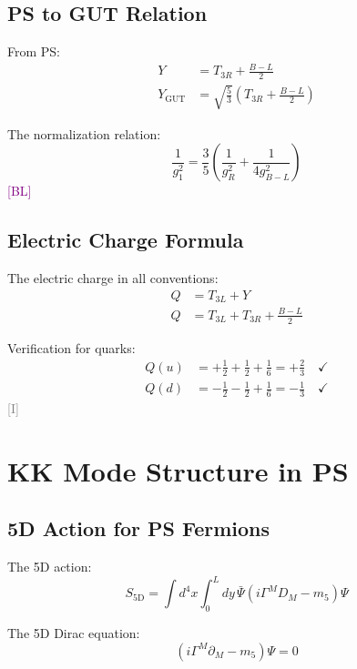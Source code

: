 \documentclass[11pt,a4paper]{article}
\newcommand{\tagI}{\textcolor{gray}{[I]}}
\newcommand{\tagBL}{\textcolor{purple}{[BL]}}
\begin{document}
\subsection{PS to GUT Relation}

From PS:
\begin{align}
\label{eq:Y-from-ps}
Y &= T_{3R} + \frac{B-L}{2} \\
\label{eq:Y-gut-from-ps}
Y_{\text{GUT}} &= \sqrt{\frac{5}{3}} \left(T_{3R} + \frac{B-L}{2}\right)
\end{align}

The normalization relation:
\begin{equation}
\label{eq:norm-relation}
\frac{1}{g_1^2} = \frac{3}{5} \left(\frac{1}{g_R^2} + \frac{1}{4 g_{B-L}^2}\right)
\end{equation}
\tagBL

\subsection{Electric Charge Formula}

The electric charge in all conventions:
\begin{align}
\label{eq:Q-sm}
Q &= T_{3L} + Y \\
\label{eq:Q-ps}
Q &= T_{3L} + T_{3R} + \frac{B-L}{2}
\end{align}

Verification for quarks:
\begin{align}
\label{eq:Q-u}
Q(u) &= +\frac{1}{2} + \frac{1}{2} + \frac{1}{6} = +\frac{2}{3} \quad \checkmark \\
\label{eq:Q-d}
Q(d) &= -\frac{1}{2} - \frac{1}{2} + \frac{1}{6} = -\frac{1}{3} \quad \checkmark
\end{align}
\tagI

\section{KK Mode Structure in PS}
\label{app:kk}

\subsection{5D Action for PS Fermions}

The 5D action:
\begin{equation}
\label{eq:5d-action-ps}
S_{\text{5D}} = \int d^4x \int_0^L dy\, \bar{\Psi}(i\Gamma^M D_M - m_5)\Psi
\end{equation}

The 5D Dirac equation:
\begin{equation}
\label{eq:5d-dirac}
(i\Gamma^M \partial_M - m_5)\Psi = 0
\end{equation}
\end{document}
